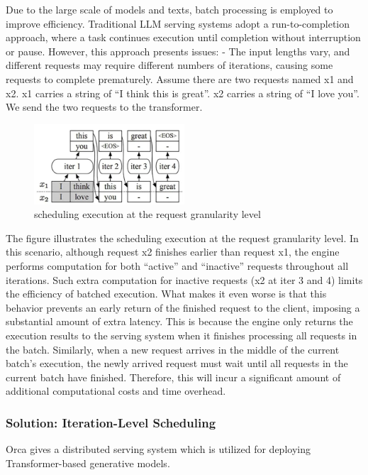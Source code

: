 \documentclass[conference]{IEEEtran}
\begin{document}
Due to the large scale of models and texts, batch processing is employed to improve efficiency. Traditional LLM serving systems adopt a run-to-completion approach, where a task continues execution until completion without interruption or pause. However, this approach presents issues:
- The input lengths vary, and different requests may require different numbers of iterations, causing some requests to complete prematurely.
Assume there are two requests named x1 and x2. x1 carries a string of “I think this is great”. x2 carries a string of “I love you”. We send the two requests to the transformer.
\begin{figure}[htbp]
    \centerline{\includegraphics[width=0.5\textwidth]{process fig1.png}}
    \caption{scheduling execution at the request granularity level}
    \label{fig}
\end{figure}
The figure illustrates the scheduling execution at the request granularity level. In this scenario,
although request x2 finishes earlier than request x1, the engine performs computation for both “active” and “inactive” requests throughout all iterations. Such extra computation for inactive requests (x2 at iter 3 and 4) limits the efficiency of batched execution. What makes it even worse is that this behavior prevents an early return of the finished request to the client, imposing a substantial amount of extra latency. This is because the engine only returns the execution results to the serving system when it finishes processing all requests in the batch. Similarly, when a new request arrives in the middle of the current batch’s execution, the newly arrived request must wait until all requests in the current batch have finished. Therefore, this will incur a significant amount of additional computational costs and time overhead. \cite{b10}


\subsubsection{Solution: Iteration-Level Scheduling}


Orca gives a distributed serving system which is utilized for deploying Transformer-based generative models.
\end{document}
